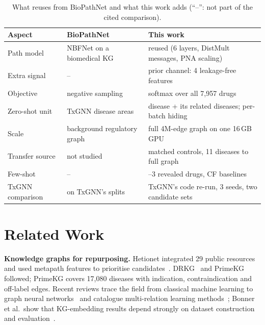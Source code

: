 \documentclass[journal]{IEEEtran}
\begin{document}
\begin{table}[!t]
\centering
\caption{What \sysname reuses from BioPathNet and what this work adds (``--'': not part of the cited comparison).}
\label{tab:novelty}
\scriptsize
\setlength{\tabcolsep}{3pt}
\begin{tabular}{>{\raggedright\arraybackslash}p{1.75cm}>{\raggedright\arraybackslash}p{2.35cm}>{\raggedright\arraybackslash}p{4.1cm}}
\toprule
Aspect & BioPathNet~\cite{hu2026biopathnet} & This work \\
\midrule
Path model & NBFNet on a biomedical KG & reused (6 layers, DistMult messages, PNA scaling) \\
Extra signal & -- & prior channel: 4 leakage-free features \\
Objective & negative sampling & softmax over all 7,957 drugs \\
Zero-shot unit & TxGNN disease areas & disease + its related diseases; per-batch hiding \\
Scale & background regulatory graph & full 4M-edge graph on one 16\,GB GPU \\
Transfer source & not studied & matched controls, 11 diseases to full graph \\
Few-shot & -- & 1--3 revealed drugs, CF baselines \\
TxGNN comparison & on TxGNN's splits & TxGNN's code re-run, 3 seeds, two candidate sets \\
\bottomrule
\end{tabular}
\end{table}

\section{Related Work}
\label{sec:related}
\textbf{Knowledge graphs for repurposing.} Hetionet integrated 29 public resources and used metapath features to prioritise candidates~\cite{himmelstein2017hetionet}. DRKG~\cite{drkg2020} and PrimeKG~\cite{chandak2023primekg} followed; PrimeKG covers 17,080 diseases with indication, contraindication and off-label edges. Recent reviews trace the field from classical machine learning to graph neural networks~\cite{wei2025kgreview} and catalogue multi-relation learning methods~\cite{kumar2025scoping}; Bonner et al.\ show that KG-embedding results depend strongly on dataset construction and evaluation~\cite{bonner2022review,bonner2022kge}.
\end{document}
